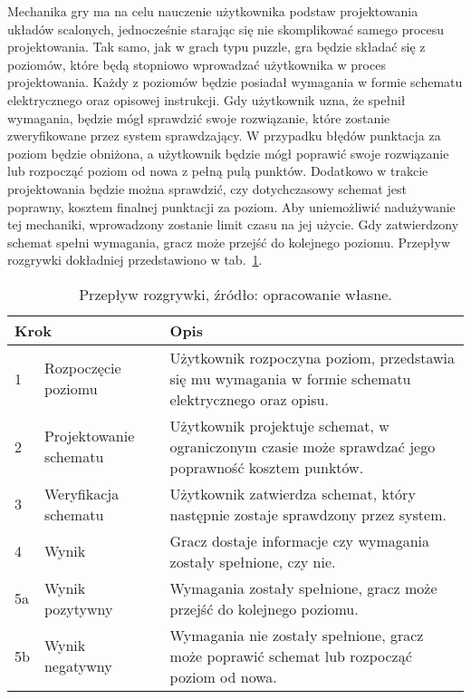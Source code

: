 Mechanika gry ma na celu nauczenie użytkownika podstaw projektowania układów scalonych,
jednocześnie starając się nie skomplikować samego procesu projektowania.
Tak samo, jak w grach typu puzzle, gra będzie składać się z poziomów,
które będą stopniowo wprowadzać użytkownika w proces projektowania.
Każdy z poziomów będzie posiadał wymagania w formie schematu elektrycznego oraz opisowej instrukcji.
Gdy użytkownik uzna, że spełnił wymagania, będzie mógł sprawdzić swoje rozwiązanie,
które zostanie zweryfikowane przez system sprawdzający.
W przypadku błędów punktacja za poziom będzie obniżona,
a użytkownik będzie mógł poprawić swoje rozwiązanie lub rozpocząć poziom od nowa z pełną pulą punktów.
Dodatkowo w trakcie projektowania będzie można sprawdzić, czy dotychczasowy schemat jest poprawny,
kosztem finalnej punktacji za poziom.
Aby uniemożliwić nadużywanie tej mechaniki, wprowadzony zostanie limit czasu na jej użycie.
Gdy zatwierdzony schemat spełni wymagania, gracz może przejść do kolejnego poziomu.
Przepływ rozgrywki dokładniej przedstawiono w tab.~\ref{tab:game_flow}.

\begin{table}[h]
    \centering
    \caption[Przepływ rozgrywki.]
    {Przepływ rozgrywki, źródło: opracowanie własne.}
    \label{tab:game_flow}
    \begin{tabular}{|l p{}|p{}|}
        \hline
        \multicolumn{2}{|l|}{Krok} & Opis \\
        \hline
        \hline
        1 & Rozpoczęcie poziomu &
        Użytkownik rozpoczyna poziom, przedstawia się mu wymagania w formie schematu elektrycznego oraz opisu. \\
        \hline
        2 & Projektowanie schematu &
        Użytkownik projektuje schemat, w ograniczonym czasie może sprawdzać jego poprawność kosztem punktów. \\
        \hline
        3 & Weryfikacja schematu &
        Użytkownik zatwierdza schemat, który następnie zostaje sprawdzony przez system. \\
        \hline
        4 & Wynik &
        Gracz dostaje informacje czy wymagania zostały spełnione, czy nie. \\
        \hline
        5a & Wynik pozytywny &
        Wymagania zostały spełnione, gracz może przejść do kolejnego poziomu. \\
        \hline
        5b & Wynik negatywny &
        Wymagania nie zostały spełnione, gracz może poprawić schemat lub rozpocząć poziom od nowa. \\
        \hline
    \end{tabular}
\end{table}

